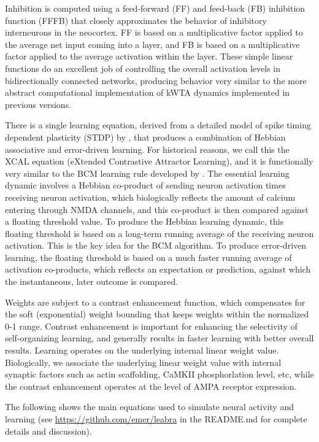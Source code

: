 \documentclass[11pt,twoside]{article}
\newif\myifpdf
\begin{document}
Inhibition is computed using a feed-forward (FF) and feed-back (FB) inhibition function (FFFB) that closely approximates the behavior of inhibitory interneurons in the neocortex. FF is based on a multiplicative factor applied to the average net input coming into a layer, and FB is based on a multiplicative factor applied to the average activation within the layer. These simple linear functions do an excellent job of controlling the overall activation levels in bidirectionally connected networks, producing behavior very similar to the more abstract computational implementation of kWTA dynamics implemented in previous versions.

There is a single learning equation, derived from a detailed model of spike timing dependent plasticity (STDP) by \citet{UrakuboHondaFroemkeEtAl08}, that produces a combination of Hebbian associative and error-driven learning. For historical reasons, we call this the XCAL equation (eXtended Contrastive Attractor Learning), and it is functionally very similar to the BCM learning rule developed by \citet{BienenstockCooperMunro82}. The essential learning dynamic involves a Hebbian co-product of sending neuron activation times receiving neuron activation, which biologically reflects the amount of calcium entering through NMDA channels, and this co-product is then compared against a floating threshold value. To produce the Hebbian learning dynamic, this floating threshold is based on a long-term running average of the receiving neuron activation. This is the key idea for the BCM algorithm. To produce error-driven learning, the floating threshold is based on a much faster running average of activation co-products, which reflects an expectation or prediction, against which the instantaneous, later outcome is compared.

Weights are subject to a contrast enhancement function, which compensates for the soft (exponential) weight bounding that keeps weights within the normalized 0-1 range. Contrast enhancement is important for enhancing the selectivity of self-organizing learning, and generally results in faster learning with better overall results. Learning operates on the underlying internal linear weight value. Biologically, we associate the underlying linear weight value with internal synaptic factors such as actin scaffolding, CaMKII phosphorlation level, etc, while the contrast enhancement operates at the level of AMPA receptor expression. 

The following shows the main equations used to simulate neural activity and learning (see \url{https://github.com/emer/leabra} in the README.md for complete details and discussion).
\end{document}
